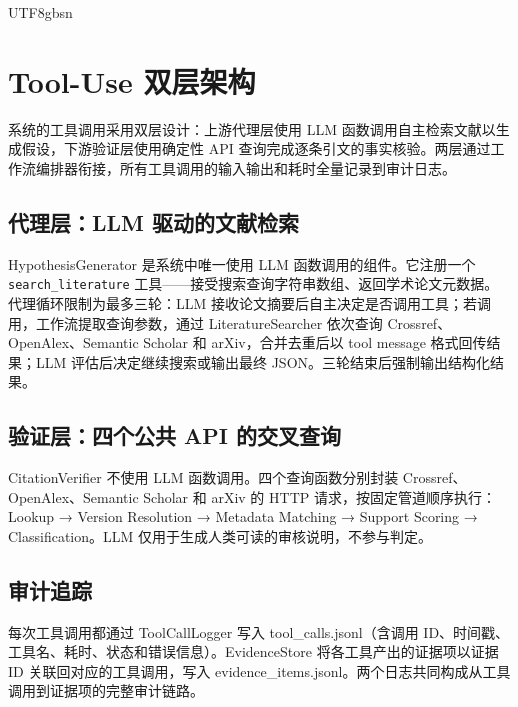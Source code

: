 \documentclass[11pt,a4paper]{article}
\begin{document}
\begin{CJK*}{UTF8}{gbsn}
\section{Tool-Use 双层架构}

系统的工具调用采用双层设计：上游代理层使用 LLM 函数调用自主检索文献以生成假设，下游验证层使用确定性 API 查询完成逐条引文的事实核验。两层通过工作流编排器衔接，所有工具调用的输入输出和耗时全量记录到审计日志。

\subsection{代理层：LLM 驱动的文献检索}

HypothesisGenerator 是系统中唯一使用 LLM 函数调用的组件。它注册一个 \texttt{search\_literature} 工具——接受搜索查询字符串数组、返回学术论文元数据。代理循环限制为最多三轮：LLM 接收论文摘要后自主决定是否调用工具；若调用，工作流提取查询参数，通过 LiteratureSearcher 依次查询 Crossref、OpenAlex、Semantic Scholar 和 arXiv，合并去重后以 tool message 格式回传结果；LLM 评估后决定继续搜索或输出最终 JSON。三轮结束后强制输出结构化结果。

\subsection{验证层：四个公共 API 的交叉查询}

CitationVerifier 不使用 LLM 函数调用。四个查询函数分别封装 Crossref、OpenAlex、Semantic Scholar 和 arXiv 的 HTTP 请求，按固定管道顺序执行：Lookup → Version Resolution → Metadata Matching → Support Scoring → Classification。LLM 仅用于生成人类可读的审核说明，不参与判定。

\subsection{审计追踪}

每次工具调用都通过 ToolCallLogger 写入 tool\_calls.jsonl（含调用 ID、时间戳、工具名、耗时、状态和错误信息）。EvidenceStore 将各工具产出的证据项以证据 ID 关联回对应的工具调用，写入 evidence\_items.jsonl。两个日志共同构成从工具调用到证据项的完整审计链路。


\end{CJK*}
\end{document}
